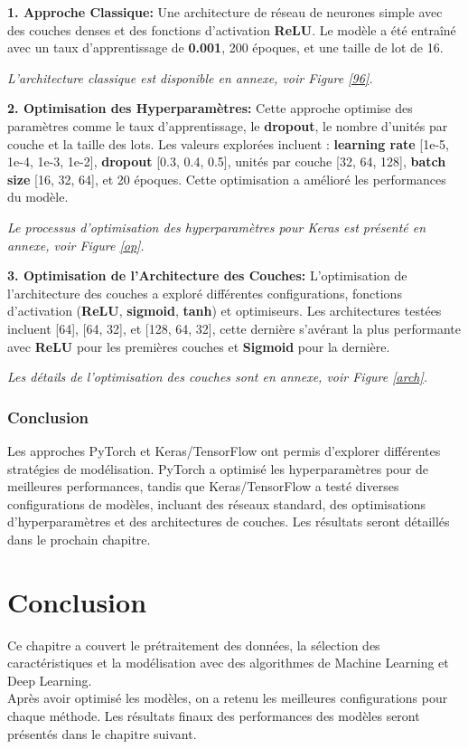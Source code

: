 \textbf{1. Approche Classique:} Une architecture de réseau de neurones simple avec des couches denses et des fonctions d'activation \textbf{ReLU}. Le modèle a été entraîné avec un taux d'apprentissage de \textbf{0.001}, 200 époques, et une taille de lot de 16.

\textit{L'architecture classique est disponible en annexe, voir Figure \ref{96}.}

\textbf{2. Optimisation des Hyperparamètres:} Cette approche optimise des paramètres comme le taux d'apprentissage, le \textbf{dropout}, le nombre d'unités par couche et la taille des lots. Les valeurs explorées incluent :
\textbf{learning rate} [1e-5, 1e-4, 1e-3, 1e-2], \textbf{dropout} [0.3, 0.4, 0.5], unités par couche [32, 64, 128], \textbf{batch size} [16, 32, 64], et 20 époques. Cette optimisation a amélioré les performances du modèle.

\textit{Le processus d'optimisation des hyperparamètres pour Keras est présenté en annexe, voir Figure \ref{op}.}

\textbf{3. Optimisation de l'Architecture des Couches:} L'optimisation de l'architecture des couches a exploré différentes configurations, fonctions d'activation (\textbf{ReLU}, \textbf{sigmoid}, \textbf{tanh}) et optimiseurs. Les architectures testées incluent [64], [64, 32], et [128, 64, 32], cette dernière s'avérant la plus performante avec \textbf{ReLU} pour les premières couches et \textbf{Sigmoid} pour la dernière.

\textit{Les détails de l'optimisation des couches sont en annexe, voir Figure \ref{arch}.}


\subsubsection{Conclusion}
Les approches PyTorch et Keras/TensorFlow ont permis d'explorer différentes stratégies de modélisation. PyTorch a optimisé les hyperparamètres pour de meilleures performances, tandis que Keras/TensorFlow a testé diverses configurations de modèles, incluant des réseaux standard, des optimisations d'hyperparamètres et des architectures de couches. Les résultats seront détaillés dans le prochain chapitre.

\section{Conclusion}

Ce chapitre a couvert le prétraitement des données, la sélection des caractéristiques et la modélisation avec des algorithmes de Machine Learning et Deep Learning.\\ 
Après avoir optimisé les modèles, on a retenu les meilleures configurations pour chaque méthode. Les résultats finaux des performances des modèles seront présentés dans le chapitre suivant.
